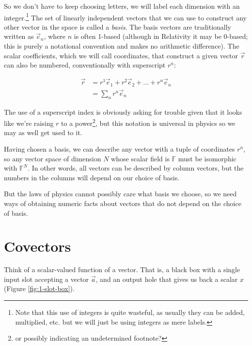 So we don't have to keep choosing letters, we will label each dimension with an integer.\footnote{Note that this use of integers is quite wasteful, as usually they can be added, multiplied, etc. but we will just be using integers as mere labels.} The set of linearly independent vectors that we can use to construct any other vector in the space is called a \textit{basis}. The basis vectors are traditionally written as $\vec{e}_n$, where $n$ is often 1-based (although in Relativity it may be 0-based; this is purely a notational convention and makes no arithmetic difference). The scalar coefficients, which we will call coordinates, that construct a given vector $\vec{r}$ can also be numbered, conventionally with superscript $r^n$:

\begin{equation}
\begin{split}
\vec{r} &= r^1 \vec{e}_1 + r^2 \vec{e}_2 + ... + r^n \vec{e}_n \\
        &= \sum_n r^n \vec{e}_n
\end{split}
\end{equation}

The use of a superscript index is obviously asking for trouble given that it looks like we're raising $r$ to a power\footnote{or possibly indicating an undetermined footnote?}, but this notation is universal in physics so we may as well get used to it.

Having chosen a basis, we can describe any vector with a tuple of coordinates $r^n$, so any vector space of dimension $N$ whose scalar field is $\mathbb{F}$ must be isomorphic with $\mathbb{F}^N$. In other words, all vectors can be described by column vectors, but the numbers in the columns will depend on our choice of basis.

But the laws of physics cannot possibly care what basis we choose, so we need ways of obtaining numeric facts about vectors that do not depend on the choice of basis.

\section{Covectors} \label{covector}

Think of a scalar-valued function of a vector. That is, a black box with a single input slot accepting a vector $\vec{a}$, and an output hole that gives us back a scalar $x$ (Figure \ref{fig:1-slot-box}).

